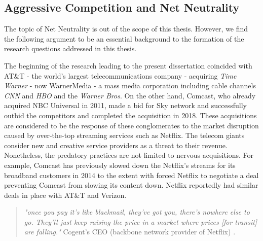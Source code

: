 \subsection{Aggressive Competition and Net Neutrality}
\label{Back:Sec:sharing:sub:competition}
The topic of Net Neutrality is out of the scope of this thesis. However, we find the following argument to be an essential background to the formation of the research questions addressed in this thesis.

The beginning of the research leading to the present dissertation coincided with AT\&T - the world's largest telecommunications company - acquiring \textit{Time Warner} - now WarnerMedia - a mass media corporation including cable channels \textit{CNN} and \textit{HBO} and the \textit{Warner Bros}. On the other hand, Comcast, who already acquired NBC Universal in 2011, made a bid for Sky network and successfully outbid the competitors and completed the acquisition in 2018. These acquisitions are considered to be the response of these conglomerates to the market disruption caused by over-the-top streaming services such as Netflix. The telecom giants consider new and creative service providers as a threat to their revenue. Nonetheless, the predatory practices are not limited to nervous acquisitions. For example, Comcast has previously slowed down the Netflix's streams for its broadband customers in 2014 to the extent with forced Netflix to negotiate a deal preventing Comcast from slowing its content down. Netflix reportedly had similar deals in place with AT\&T and Verizon. 
\vspace{-5pt}
\begin{quote}
  \textit{"once you pay it's like blackmail, they've got you, there's nowhere else to go. They'll just keep raising the price in a market where prices [for transit] are falling."}
  Cogent's CEO (backbone network provider of Netflix) \cite{lee_comcasts_2014}.
\end{quote}
\vspace{-5pt}

